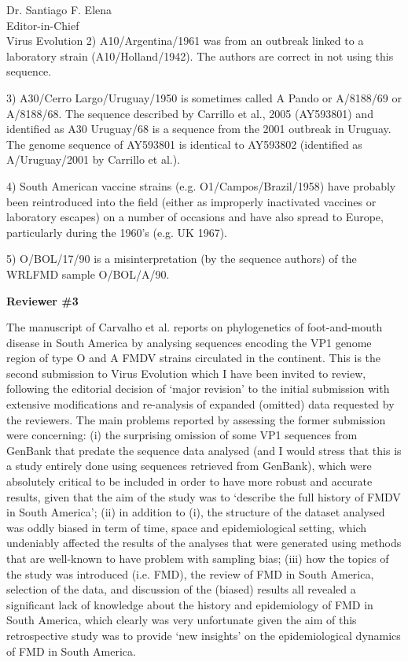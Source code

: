 \documentclass[12pt, a4paper]{letter} %
\begin{document}
\begin{letter}{
	Dr. Santiago F. Elena\\
    Editor-in-Chief \\
    Virus Evolution
}
2)      A10/Argentina/1961 was from an outbreak linked to a laboratory strain (A10/Holland/1942). The authors are correct in not using this sequence.

3)      A30/Cerro Largo/Uruguay/1950 is sometimes called A Pando or A/8188/69 or A/8188/68. The sequence described by Carrillo et al., 2005 (AY593801) and identified as A30 Uruguay/68 is a sequence from the 2001 outbreak in Uruguay. The genome sequence of AY593801 is identical to AY593802 (identified as A/Uruguay/2001 by Carrillo et al.).

4)      South American vaccine strains (e.g. O1/Campos/Brazil/1958) have probably been reintroduced into the field (either as improperly inactivated vaccines or laboratory escapes) on a number of occasions and have also spread to Europe, particularly during the 1960’s (e.g. UK 1967).

5)      O/BOL/17/90 is a misinterpretation (by the sequence authors) of the WRLFMD sample O/BOL/A/90.


\textbf{Reviewer \#3}

The manuscript of Carvalho et al. reports on phylogenetics of foot-and-mouth disease in South America by analysing sequences encoding the VP1 genome region of type O and A FMDV strains circulated in the continent.
This is the second submission to Virus Evolution which I have been invited to review, following the editorial decision of ‘major revision’ to the initial submission with extensive modifications and re-analysis of expanded (omitted) data requested by the reviewers.
The main problems reported by assessing the former submission were concerning: (i) the surprising omission of some VP1 sequences from GenBank that predate the sequence data analysed (and I would stress that this is a study entirely done using sequences retrieved from GenBank), which were absolutely critical to be included in order to have more robust and accurate results, given that the aim of the study was to ‘describe the full history of FMDV in South America’; (ii) in addition to (i), the structure of the dataset analysed was oddly biased in term of time, space and epidemiological setting, which undeniably affected the results of the analyses that were generated using methods that are well-known to  have problem with sampling bias; (iii) how the topics of the study was introduced (i.e. FMD), the review of FMD in South America, selection of the data, and discussion of the (biased) results all revealed a significant lack of knowledge about the history and epidemiology of FMD in South America, which clearly was very unfortunate given the aim of this retrospective study was to provide ‘new insights’ on the epidemiological dynamics of FMD in South America.


\end{letter}
\end{document}

